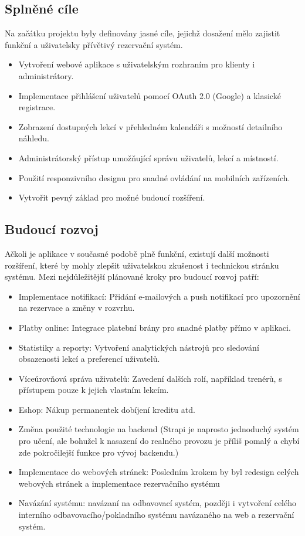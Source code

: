 \documentclass[12pt, a4paper,
openright
]{report}
\begin{document}
\subsection{Splněné cíle}
Na začátku projektu byly definovány jasné cíle, jejichž dosažení mělo zajistit funkční a uživatelsky přívětivý rezervační systém.
\begin{itemize}
	\item Vytvoření webové aplikace s uživatelským rozhraním pro klienty i administrátory.
	\item Implementace přihlášení uživatelů pomocí OAuth 2.0 (Google) a klasické registrace.
    \item Zobrazení dostupných lekcí v přehledném kalendáři s možností detailního náhledu.
    \item Administrátorský přístup umožňující správu uživatelů, lekcí a místností.
    \item Použití responzivního designu pro snadné ovládání na mobilních zařízeních.
    \item Vytvořit pevný základ pro možné budoucí rozšíření.
\end{itemize}


\subsection{Budoucí rozvoj}
Ačkoli je aplikace v současné podobě plně funkční, existují další možnosti rozšíření, které by mohly zlepšit uživatelskou zkušenost i technickou stránku systému. Mezi nejdůležitější plánované kroky pro budoucí rozvoj patří:
\begin{itemize}
\item Implementace notifikací: Přidání e-mailových a push notifikací pro upozornění na rezervace a změny v rozvrhu.
\item Platby online: Integrace platební brány pro snadné platby přímo v aplikaci.
\item Statistiky a reporty: Vytvoření analytických nástrojů pro sledování obsazenosti lekcí a preferencí uživatelů.
\item Víceúrovňová správa uživatelů: Zavedení dalších rolí, například trenérů, s přístupem pouze k jejich vlastním lekcím.
\item Eshop: Nákup permanentek dobíjení kreditu atd.
\item Změna použité technologie na backend (Strapi je naprosto jednoduchý systém pro učení, ale bohužel k nasazení do realného provozu je příliš pomalý a chybí zde pokročilejší funkce pro vývoj backendu.)
\item Implementace do webových stránek: Posledním krokem by byl redesign celých webových stránek a implementace rezervačního systému
\item Navázání systému: navázaní na odbavovací systém, později i vytvoření celého interního odbavovacího/pokladního systému navázaného na web a rezervační systém.
\end{itemize}
\end{document}
